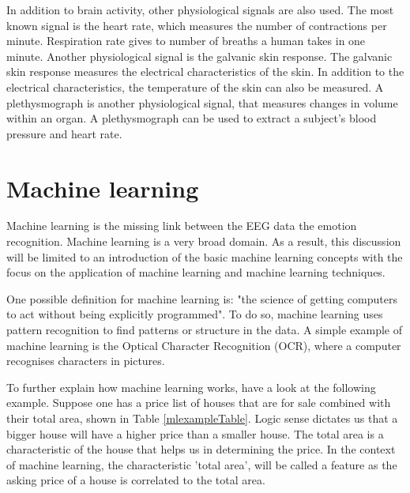 In addition to brain activity, other physiological signals are also used. The most known signal is the heart rate, which measures the number of contractions per minute. Respiration rate gives to number of breaths a human takes in one minute\citep{DEAP}. Another physiological signal is the galvanic skin response. The galvanic skin response measures the electrical characteristics of the skin\citep{GSR, DEAP}. In addition to the electrical characteristics, the temperature of the skin can also be measured. A plethysmograph is another physiological signal, that measures changes in volume within an organ\citep{DEAP}. A plethysmograph can be used to extract a subject's blood pressure and heart rate.

\section{Machine learning}
Machine learning is the missing link between the EEG data the emotion recognition. Machine learning is a very broad domain. As a result, this discussion will be limited to an introduction of the basic machine learning concepts with the focus on the application of machine learning and machine learning techniques. 

\npar

One possible definition for machine learning is: "the science of getting computers to act without being explicitly programmed"\citep{MLDef}. To do so, machine learning uses pattern recognition to find patterns or structure in the data. A simple example of machine learning is the Optical Character Recognition (OCR), where a computer recognises characters in pictures\citep{OCR}.


To further explain how machine learning works, have a look at the following example. Suppose one has a price list of houses that are for sale combined with their total area, shown in Table \ref{mlexampleTable}. Logic sense dictates us that a bigger house will have a higher price than a smaller house. The total area is a characteristic of the house that helps us in determining the price. In the context of machine learning, the characteristic 'total area', will be called a feature as the asking price of a house is correlated to the total area.

